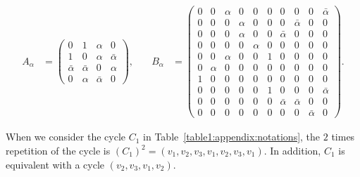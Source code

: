 \documentclass{article}
\theoremstyle{plain}
\begin{document}
\begin{align*}
	A_{\alpha} & = \begin{pmatrix}
		               0            & 1            & \alpha       & 0
		               \\
		               1            & 0            & \alpha       & \bar{\alpha}
		               \\
		               \bar{\alpha} & \bar{\alpha} & 0            & \alpha
		               \\
		               0            & \alpha       & \bar{\alpha} & 0
	               \end{pmatrix}
	,          & \quad
	B_{\alpha} & = \begin{pmatrix}
		               0 & 0      & \alpha & 0      & 0      & 0 & 0            & 0            & 0            & \bar{\alpha}
		               \\
		               0 & 0      & 0      & \alpha & 0      & 0 & 0            & \bar{\alpha} & 0            & 0
		               \\
		               0 & 0      & 0      & \alpha & 0      & 0 & \bar{\alpha} & 0            & 0            & 0
		               \\
		               0 & 0      & 0      & 0      & \alpha & 0 & 0            & 0            & 0            & 0
		               \\
		               0 & 0      & \alpha & 0      & 0      & 1 & 0            & 0            & 0            & 0
		               \\
		               0 & \alpha & 0      & 0      & 0      & 0 & 0            & 0            & 0            & 0
		               \\
		               1 & 0      & 0      & 0      & 0      & 0 & 0            & 0            & 0            & 0
		               \\
		               0 & 0      & 0      & 0      & 0      & 1 & 0            & 0            & 0            & \bar{\alpha}
		               \\
		               0 & 0      & 0      & 0      & 0      & 0 & \bar{\alpha} & \bar{\alpha} & 0            & 0
		               \\
		               0 & 0      & 0      & 0      & 0      & 0 & 0            & 0            & \bar{\alpha} & 0
	               \end{pmatrix}
	.
\end{align*}

When we consider the cycle $C_1$ in Table~\ref{table1:appendix:notations},
the $2$ times repetition of the cycle is $( C_1 )^2 = (v_1, v_2, v_3, v_1, v_2, v_3, v_1)$.
In addition, $C_1$ is equivalent with a cycle $(v_2, v_3, v_1, v_2)$.
\end{document}
